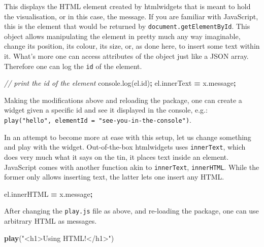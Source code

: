 \documentclass[
  10pt,
]{krantz}
\makeatletter
\newenvironment{Shaded}{\begin{snugshade}}{\end{snugshade}}
\newcommand{\AttributeTok}[1]{\textcolor[rgb]{0.61,0.61,0.61}{#1}}
\newcommand{\CommentTok}[1]{\textcolor[rgb]{0.37,0.37,0.37}{\textit{#1}}}
\newcommand{\KeywordTok}[1]{\textcolor[rgb]{0.27,0.27,0.27}{\textbf{#1}}}
\newcommand{\NormalTok}[1]{#1}
\newcommand{\OperatorTok}[1]{\textcolor[rgb]{0.43,0.43,0.43}{\textbf{#1}}}
\newcommand{\StringTok}[1]{\textcolor[rgb]{0.5,0.5,0.5}{#1}}
\newcommand{\VariableTok}[1]{\textcolor[rgb]{0,0,0}{#1}}
\newenvironment{kframe}{%
\medskip{}
\setlength{\fboxsep}{.8em}
 \def\at@end@of@kframe{}%
 \ifinner\ifhmode%
  \def\at@end@of@kframe{\end{minipage}}%
  \begin{minipage}{\columnwidth}%
 \fi\fi%
 \def\FrameCommand##1{\hskip\@totalleftmargin \hskip-\fboxsep
 \colorbox{shadecolor}{##1}\hskip-\fboxsep
     \hskip-\linewidth \hskip-\@totalleftmargin \hskip\columnwidth}%
 \MakeFramed {\advance\hsize-\width
   \@totalleftmargin\z@ \linewidth\hsize
   \@setminipage}}%
 {\par\unskip\endMakeFramed%
 \at@end@of@kframe}
\renewenvironment{Shaded}{\begin{kframe}}{\end{kframe}}
\makeatother
\begin{document}
This displays the HTML element created by htmlwidgets that is meant to hold the visualisation, or in this case, the message. If you are familiar with JavaScript, this is the element that would be returned by \texttt{document.getElementById}. This object allows manipulating the element in pretty much any way imaginable, change its position, its colour, its size, or, as done here, to insert some text within it. What's more one can access attributes of the object just like a JSON array. Therefore one can log the \texttt{id} of the element.

\begin{Shaded}
\begin{Highlighting}[]
\CommentTok{// print the id of the element}
\VariableTok{console}\NormalTok{.}\AttributeTok{log}\NormalTok{(}\VariableTok{el}\NormalTok{.}\AttributeTok{id}\NormalTok{)}\OperatorTok{;}
\VariableTok{el}\NormalTok{.}\AttributeTok{innerText} \OperatorTok{=} \VariableTok{x}\NormalTok{.}\AttributeTok{message}\OperatorTok{;}
\end{Highlighting}
\end{Shaded}

Making the modifications above and reloading the package, one can create a widget given a specific id and see it displayed in the console, e.g.: \texttt{play("hello",\ elementId\ =\ "see-you-in-the-console")}.

In an attempt to become more at ease with this setup, let us change something and play with the widget. Out-of-the-box htmlwidgets uses \texttt{innerText}, which does very much what it says on the tin, it places text inside an element. JavaScript comes with another function akin to \texttt{innerText}, \texttt{innerHTML}. While the former only allows inserting text, the latter lets one insert any HTML.

\begin{Shaded}
\begin{Highlighting}[]
\VariableTok{el}\NormalTok{.}\AttributeTok{innerHTML} \OperatorTok{=} \VariableTok{x}\NormalTok{.}\AttributeTok{message}\OperatorTok{;}
\end{Highlighting}
\end{Shaded}

After changing the \texttt{play.js} file as above, and re-loading the package, one can use arbitrary HTML as messages.

\begin{Shaded}
\begin{Highlighting}[]
\KeywordTok{play}\NormalTok{(}\StringTok{"<h1>Using HTML!</h1>"}\NormalTok{)}
\end{Highlighting}
\end{Shaded}
\end{document}
